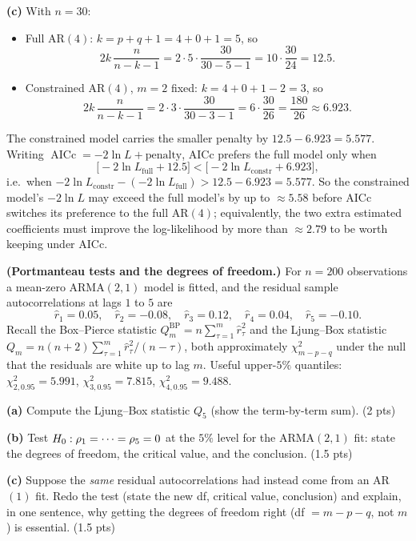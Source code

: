 \documentclass[11pt]{article}
\DeclareMathOperator{\AICc}{AICc}
\begin{document}
\textbf{(c)} With $n=30$:
\begin{itemize}
  \item Full AR$(4)$: $k=p+q+1=4+0+1=5$, so
        \[
        2k\,\frac{n}{n-k-1}=2\cdot5\cdot\frac{30}{30-5-1}=10\cdot\frac{30}{24}=12.5 .
        \]
  \item Constrained AR$(4)$, $m=2$ fixed: $k=4+0+1-2=3$, so
        \[
        2k\,\frac{n}{n-k-1}=2\cdot3\cdot\frac{30}{30-3-1}=6\cdot\frac{30}{26}=\frac{180}{26}\approx6.923 .
        \]
\end{itemize}
The constrained model carries the smaller penalty by $12.5-6.923=5.577$. Writing $\AICc=-2\ln L+\text{penalty}$, AICc prefers the full model only when
\[
\bigl[-2\ln L_{\text{full}}+12.5\bigr]<\bigl[-2\ln L_{\text{constr}}+6.923\bigr],
\]
i.e.\ when $-2\ln L_{\text{constr}}-(-2\ln L_{\text{full}})>12.5-6.923=5.577$. So the constrained model's $-2\ln L$ may exceed the full model's by up to $\boxed{\approx5.58}$ before AICc switches its preference to the full AR$(4)$; equivalently, the two extra estimated coefficients must improve the log-likelihood by more than $\approx2.79$ to be worth keeping under AICc.

\statementstart
\textbf{(Portmanteau tests and the degrees of freedom.)} For $n=200$ observations a mean-zero ARMA$(2,1)$ model is fitted, and the residual sample autocorrelations at lags $1$ to $5$ are
\[
\hat r_1=0.05,\quad \hat r_2=-0.08,\quad \hat r_3=0.12,\quad \hat r_4=0.04,\quad \hat r_5=-0.10 .
\]
Recall the Box--Pierce statistic $Q_m^{\mathrm{BP}}=n\sum_{\tau=1}^m\hat r_\tau^2$ and the Ljung--Box statistic $Q_m=n(n+2)\sum_{\tau=1}^m\hat r_\tau^2/(n-\tau)$, both approximately $\chi^2_{m-p-q}$ under the null that the residuals are white up to lag $m$. Useful upper-$5\%$ quantiles: $\chi^2_{2,0.95}=5.991$, $\chi^2_{3,0.95}=7.815$, $\chi^2_{4,0.95}=9.488$.

\textbf{(a)} Compute the Ljung--Box statistic $Q_5$ (show the term-by-term sum). \hfill(2 pts)

\textbf{(b)} Test $H_0:\rho_1=\cdots=\rho_5=0$ at the $5\%$ level for the ARMA$(2,1)$ fit: state the degrees of freedom, the critical value, and the conclusion. \hfill(1.5 pts)

\textbf{(c)} Suppose the \emph{same} residual autocorrelations had instead come from an AR$(1)$ fit. Redo the test (state the new df, critical value, conclusion) and explain, in one sentence, why getting the degrees of freedom right (df $=m-p-q$, not $m$) is essential. \hfill(1.5 pts)
\statementend
\end{document}
